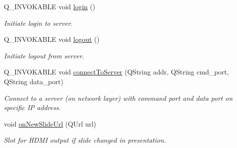 \begin{DoxyCompactItemize}
Q\+\_\+\+I\+N\+V\+O\+K\+A\+B\+L\+E void \hyperlink{class_client_a923c7418e192b80599e3a36565ac4649}{login} ()
\begin{DoxyCompactList}\small\item\em Initiate login to server. \end{DoxyCompactList}\item 
Q\+\_\+\+I\+N\+V\+O\+K\+A\+B\+L\+E void \hyperlink{class_client_aa977795294407c10fe843b5bc28b6685}{logout} ()
\begin{DoxyCompactList}\small\item\em Initiate logout from server. \end{DoxyCompactList}\item 
Q\+\_\+\+I\+N\+V\+O\+K\+A\+B\+L\+E void \hyperlink{class_client_ae808db8dfa518dfb74c5ef48385dfc55}{connect\+To\+Server} (Q\+String addr, Q\+String cmd\+\_\+port, Q\+String data\+\_\+port)
\begin{DoxyCompactList}\small\item\em Connect to a server (on network layer) with command port and data port on specific I\+P address. \end{DoxyCompactList}\item 
void \hyperlink{class_client_a158fe80befa311a81900fc7c176a4654}{on\+New\+Slide\+Url} (Q\+Url url)
\begin{DoxyCompactList}\small\item\em Slot for H\+D\+M\+I output if slide changed in presentation. \end{DoxyCompactList}\end{DoxyCompactItemize}
